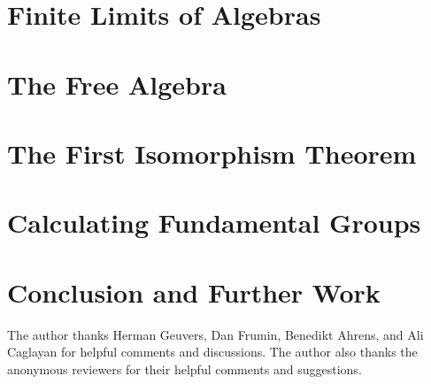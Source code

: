 \documentclass[screen]{acmart}
\theoremstyle{plain}
\theoremstyle{definition}
\begin{document}
\section{Finite Limits of Algebras}
\label{sec:finite_limits}


\section{The Free Algebra}
\label{sec:free_algebra}


\section{The First Isomorphism Theorem}
\label{sec:isomorphism_theorem}


\section{Calculating Fundamental Groups}
\label{sec:fundamental_groups}


\section{Conclusion and Further Work}
\label{sec:conclusion}



\begin{acks}
The author thanks Herman Geuvers, Dan Frumin, Benedikt Ahrens, and Ali Caglayan for helpful comments and discussions.
The author also thanks the anonymous reviewers for their helpful comments and suggestions.
\end{acks}



\end{document}
